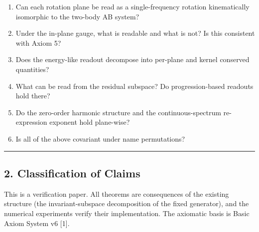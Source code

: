 \documentclass[
  a4paper,
]{article}
\providecommand{\tightlist}{%
  \setlength{\itemsep}{0pt}\setlength{\parskip}{0pt}}
\begin{document}
\begin{enumerate}
\def\labelenumi{\arabic{enumi}.}
\tightlist
\item
  Can each rotation plane be read as a single-frequency rotation
  kinematically isomorphic to the two-body AB system?
\item
  Under the in-plane gauge, what is readable and what is not? Is this
  consistent with Axiom 5?
\item
  Does the energy-like readout decompose into per-plane and kernel
  conserved quantities?
\item
  What can be read from the residual subspace? Do progression-based
  readouts hold there?
\item
  Do the zero-order harmonic structure and the continuous-spectrum
  re-expression exponent hold plane-wise?
\item
  Is all of the above covariant under name permutations?
\end{enumerate}

\begin{center}\rule{0.5\linewidth}{0.5pt}\end{center}

\subsection{2. Classification of Claims}\label{classification-of-claims}

This is a verification paper. All theorems are consequences of the
existing structure (the invariant-subspace decomposition of the fixed
generator), and the numerical experiments verify their implementation.
The axiomatic basis is Basic Axiom System v6 {[}1{]}.
\end{document}
